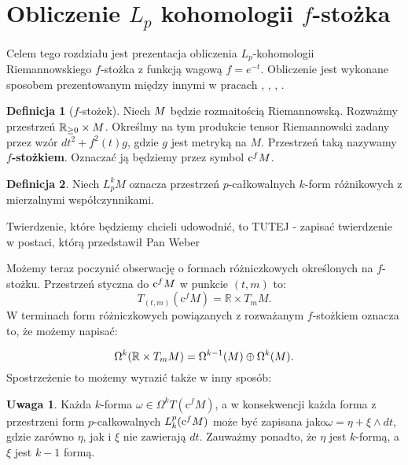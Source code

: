 \documentclass[licencjacka]{pracamgr}
\theoremstyle{definition}
\newtheorem{definition}{Definicja}[section]
\theoremstyle{definition}
\newtheorem{remark}{Uwaga}[section]
\theoremstyle{plain}
\theoremstyle{plain}
\theoremstyle{plain}
\theoremstyle{plain}
\def\cfm{\ensuremath\mathrm{c}^fM}
\def\M{\ensuremath M}
\begin{document}
\section{Obliczenie $L_p$ kohomologii $f$-stożka}
Celem tego rozdziału jest prezentacja obliczenia 
$L_p$-kohomologii Riemannowskiego $f$-stożka z funkcją wagową $f = e^{-t}$.
Obliczenie jest wykonane sposobem prezentowanym między innymi w
pracach \cite{cheeger}, \cite{youssin}, \cite{kirwan}, \cite{weber}.

\begin{definition}[$f$-stożek]
    Niech $\M$ będzie rozmaitością Riemannowską. Rozważmy przestrzeń
    $\mathbb{R}_{\geq 0} \times \M$. Określmy na tym produkcie tensor
    Riemannowski zadany przez wzór $dt^2 + f^{2}(t)g $, gdzie $g$ jest
    metryką na $M$.  Przestrzeń taką nazywamy \textbf{$f$-stożkiem}.
    Oznaczać ją będziemy przez symbol $\cfm$.
\end{definition}

\begin{definition}
  Niech $L_p^k M$ oznacza przestrzeń $p$-całkowalnych 
  $k$-form różnikowych z mierzalnymi  współczynnikami.
\end{definition}

Twierdzenie, które będziemy chcieli udowodnić, to
TUTEJ - zapisać twierdzenie w postaci, którą przedstawił Pan Weber



Możemy teraz poczynić obserwację o formach różniczkowych określonych na 
$f$-stożku. Przestrzeń styczna do $\cfm$ w punkcie $(t, m)$ to:
\[
    T_{(t, m)} (\mathrm{c}^f M) = \mathbb{R} \times T_m M.
\]
W terminach form różniczkowych powiązanych z rozważanym $f$-stożkiem oznacza
to, że możemy napisać:

\[
\Omega^k(\mathbb{R} \times T_m \M) = 
\Omega^{k-1}(\M)  \oplus \Omega^k(\M).
\]
Spostrzeżenie to możemy wyrazić także w inny sposób: 

\begin{remark}
Każda $k$-forma $\omega \in \Omega^k T(\mathrm{c}^f M)$, 
a w konsekwencji każda forma z przestrzeni form $p$-całkowalnych  $L_k^p
(\cfm)$ może być zapisana jako$\omega = \eta + \xi \wedge dt$,
gdzie zarówno $\eta$, jak i  $\xi$ nie zawierają $dt$.  Zauważmy ponadto,
że $\eta$ jest $k$-formą, a $\xi$ jest $k-1$ formą. \\
\end{remark}
\end{document}
